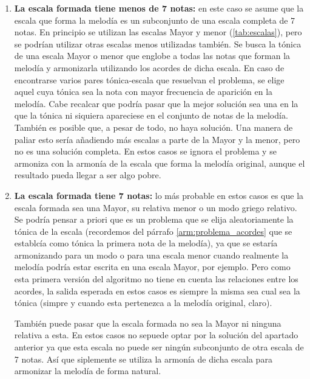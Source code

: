 \begin{enumerate}
    \item[\textbullet] \textbf{La escala formada tiene menos de 7 notas:} en este caso se asume que la escala que forma la melodía es un subconjunto de una escala completa de 7 notas. En principio se utilizan las escalas Mayor y menor (\ref{tab:escalas}), pero se podrían utilizar otras escalas menos utilizadas también. Se busca la tónica de una escala Mayor o menor que englobe a todas las notas que forman la melodía y armonizarla utilizando los acordes de dicha escala. En caso de encontrarse varios pares tónica-escala que resuelvan el problema, se elige aquel cuya tónica sea la nota con mayor frecuencia de aparición en la melodía. Cabe recalcar que podría pasar que la mejor solución sea una en la que la tónica ni siquiera apareciese en el conjunto de notas de la melodía. También es posible que, a pesar de todo, no haya solución. Una manera de paliar esto sería añadiendo más escalas a parte de la Mayor y la menor, pero no es una solución completa. En estos casos se ignora el problema y se armoniza con la armonía de la escala que forma la melodía original, aunque el resultado pueda llegar a ser algo pobre.
    \item[\textbullet] \textbf{La escala formada tiene 7 notas:} lo más probable en estos casos es que la escala formada sea una Mayor, su relativa menor o un modo griego relativo. Se podría pensar a priori que es un problema que se elija aleatoriamente la tónica de la escala (recordemos del párrafo \ref{arm:problema_acordes} que se establcía como tónica la primera nota de la melodía), ya que se estaría armonizando para un modo o para una escala menor cuando realmente la melodía podría estar escrita en una escala Mayor, por ejemplo. Pero como esta primera versión del algoritmo no tiene en cuenta las relaciones entre los acordes, la salida esperada en estos casos es siempre la misma sea cual sea la tónica (simpre y cuando esta pertenezca a la melodía original, claro).

    También puede pasar que la escala formada no sea la Mayor ni ninguna relativa a esta. En estos casos no sepuede optar por la solución del apartado anterior ya que esta escala no puede ser ningún subconjunto de otra escala de 7 notas. Así que siplemente se utiliza la armonía de dicha escala para armonizar la melodía de forma natural.


\end{enumerate}
